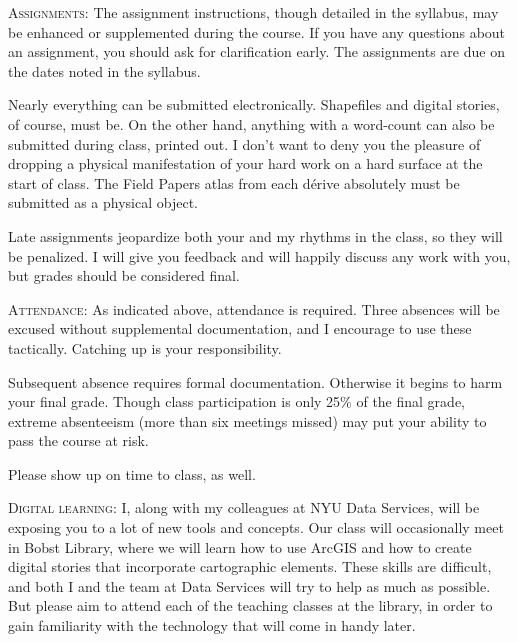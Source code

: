 \begin{description}

  \item \textsc{Assignments:} The assignment instructions, though detailed in
    the syllabus, may be enhanced or supplemented during the course. If you
    have any questions about an assignment, you should ask for clarification
    early. The assignments are due on the dates noted in the syllabus. 
    
    Nearly everything can be submitted electronically. Shapefiles and digital
    stories, of course, must be. On the other hand, anything with a word-count
    can also be submitted during class, printed out. I don’t want to deny you
    the pleasure of dropping a physical manifestation of your hard work on a
    hard surface at the start of class. The Field Papers atlas from each dérive
    absolutely must be submitted as a physical object. 
    
    Late assignments jeopardize both your and my rhythms in the class, so they
    will be penalized. I will give you feedback and will happily discuss any
    work with you, but grades should be considered final.

  \item \textsc{Attendance:} As indicated above, attendance is required. Three
    absences will be excused without supplemental documentation, and I
    encourage to use these tactically. Catching up is your responsibility.

    Subsequent absence requires formal documentation. Otherwise it begins to
    harm your final grade. Though class participation is only 25\% of the final
    grade, extreme absenteeism (more than six meetings missed) may put your
    ability to pass the course at risk.

    Please show up on time to class, as well.

  \item \textsc{Digital learning:} I, along with my colleagues at NYU Data
    Services, will be exposing you to a lot of new tools and concepts. Our
    class will occasionally meet in Bobst Library, where we will learn how to
    use ArcGIS and how to create digital stories that incorporate cartographic
    elements. These skills are difficult, and both I and the team at Data
    Services will try to help as much as possible. But please aim to attend
    each of the teaching classes at the library, in order to gain familiarity
    with the technology that will come in handy later.


\end{description}
